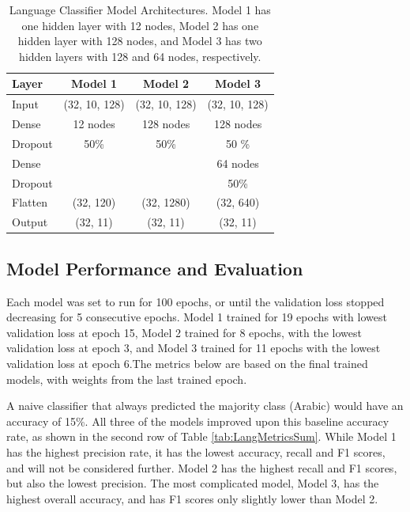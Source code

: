 \begin{table}[!h]
\begin{center}
\caption{Language Classifier Model Architectures. Model 1 has one hidden layer with 12 nodes, Model 2 has one hidden layer with 128 nodes, and Model 3 has two hidden layers with 128 and 64 nodes, respectively.}
\begin{tabular}{l | c |c  | c |}

Layer  & Model 1 & Model 2 & Model 3\\
\hline

Input 	& (32, 10, 128)& (32, 10, 128) & (32, 10, 128) \\ \hline

Dense	& 12 nodes 	& 128 nodes 	& 128 nodes \\
Dropout	& 50\%		& 50\%		& 50 \% \\ \hline

Dense	&			&			& 64 nodes \\
Dropout	&			& 			& 50\% \\ \hline

Flatten 	& (32, 120)	& (32, 1280)	& (32, 640) \\ \hline
Output 	& (32, 11)		& (32, 11)		& (32, 11)\\
\hline
\end{tabular}

\label{tab:LangModels}
\end{center}
\end{table}

\subsection{Model Performance and Evaluation}

Each model was set to run for 100 epochs, or until the validation loss stopped decreasing for 5 consecutive epochs. Model 1 trained for 19 epochs with lowest validation loss at epoch 15, Model 2 trained for 8 epochs, with the lowest validation loss at epoch 3, and Model 3 trained for 11 epochs with the lowest validation loss at epoch 6.The metrics below are based on the final trained models, with weights from the last trained epoch.

A naive classifier that always predicted the majority class (Arabic) would have an accuracy of 15\%.  All three of the models improved upon this baseline accuracy rate, as shown in the second row of Table \ref{tab:LangMetricsSum}. While Model 1 has the highest precision rate, it has the lowest accuracy, recall and F1 scores, and will not be considered further. Model 2 has the highest recall and F1 scores, but also the lowest precision. The most complicated model, Model 3, has the highest overall accuracy, and has F1 scores only slightly lower than Model 2. 

